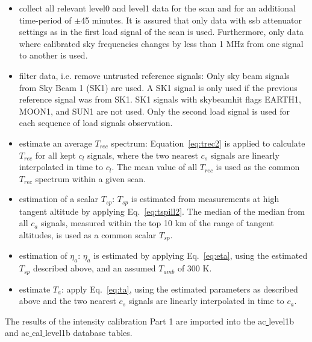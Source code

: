 \documentclass[12pt]{article}
\begin{document}
\begin{itemize}
\item collect all relevant level0 and level1 data for the scan and for an 
additional time-period of \(\pm\)45 minutes. 
It is assured that only data with ssb attenuator settings
as in the first load signal of the scan is used.
Furthermore, only data where calibrated sky frequencies changes by less
than 1 MHz from one signal to another is used.      

\item filter data, i.e. remove untrusted reference signals:\newline
Only sky beam signals from Sky Beam 1 (SK1) are used.
A SK1 signal is only used if the previous
reference signal was from SK1.
SK1 signals with skybeamhit flags EARTH1, MOON1, and SUN1 are not used.
Only the second load signal is used for each sequence of load signals
observation.  
  
\item estimate an average \(T_{rec}\) spectrum:\newline
Equation~\ref{eq:trec2} is applied to calculate \(T_{rec}\)  
for all kept \(c_{l}\) signals, where 
the two nearest \(c_{s}\) signals are linearly interpolated
in time to \(c_{l}\). 
The mean value of all \(T_{rec}\) is used as the 
common \(T_{rec}\) spectrum within a given scan.
\item estimation of a scalar \(T_{sp}\):\newline
\(T_{sp}\) is estimated from measurements at high tangent altitude
by applying Eq.~\ref{eq:tspill2}.
The median of the median 
from all \(c_{a}\) signals, measured within the top 10 km 
of the range of tangent altitudes, is used as a common scalar \(T_{sp}\).
\item estimation of \(\eta_{a}\):\newline
\(\eta_{a}\) is estimated by applying Eq.~\ref{eq:eta}, 
using the estimated \(T_{sp}\) described above, and an
assumed \(T_{amb}\) of 300 K.
\item estimate \(T_{a}\): \newline
apply Eq.~\ref{eq:ta}, using the estimated parameters as described 
above and   
the two nearest \(c_{s}\) signals are linearly interpolated
in time to \(c_{a}\).
\end{itemize}

The results of the intensity calibration Part 1 
are imported into the ac\underline{ }level1b and  
ac\underline{ }cal\underline{ }level1b database tables.
\end{document}
